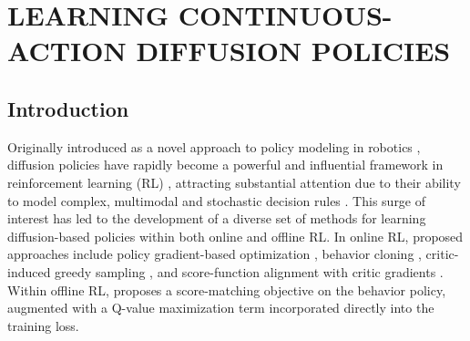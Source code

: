 \chapter{LEARNING CONTINUOUS-ACTION DIFFUSION POLICIES}
\label{ch:diffusion-policies}



\section{Introduction}

Originally introduced as a novel approach to policy modeling in robotics \citep{chi2023diffusionpolicy}, diffusion policies have rapidly become a powerful and influential framework in reinforcement learning (RL) \citep{black2023training,ren2024diffusionpolicypolicyoptimization, yang2023policyrepresentationdiffusionprobability, hansenestruch2023idqlimplicitqlearningactorcritic, wang2023diffusionpoliciesexpressivepolicy, psenka2024learningdiffusionmodelpolicy, li2024learningmultimodalbehaviorsscratch}, attracting substantial attention due to their ability to model complex, multimodal and stochastic decision rules \citep{li2024learningmultimodalbehaviorsscratch, ren2024diffusionpolicypolicyoptimization}. 
This surge of interest has led to the development of a diverse set of methods for learning diffusion-based policies within both online and offline RL. 
In online RL, proposed approaches include policy gradient-based optimization \citep{ren2024diffusionpolicypolicyoptimization}, behavior cloning \citep{chi2023diffusionpolicy}, critic-induced greedy sampling \citep{yang2023policyrepresentationdiffusionprobability, li2024learningmultimodalbehaviorsscratch}, and score-function alignment with critic gradients \citep{psenka2024learningdiffusionmodelpolicy}. 
Within offline RL, \citet{wang2023diffusionpoliciesexpressivepolicy} proposes a score-matching objective on the behavior policy, augmented with a Q-value maximization term incorporated directly into the training loss. 


